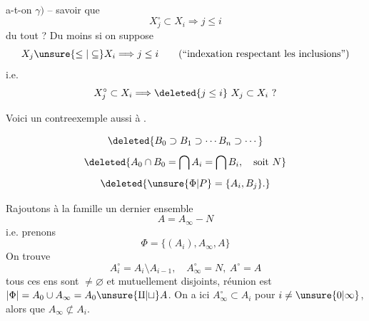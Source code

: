 
a-t-on $\gamma)$ -- savoir que
\[
X_j^\circ\subset X_i\Longrightarrow j\leq i
\]
du tout ? Du moins si  on suppose
\[
X_j\unsure{\leq|\subseteq}X_i\Longrightarrow j\leq i\qquad\text{(``indexation respectant les inclusions'')}
\]
i.e.
\[
X_j^\circ\subset X_i\Longrightarrow\deleted{j\leq i}\ X_j\subset X_i\ ?
\]

Voici un  contreexemple aussi à .

\[
\deleted{B_0\supset B_1\supset\cdots B_n\supset\cdots}
\]
\[
\deleted{A_0\cap B_0=\bigcap A_i=\bigcap B_i,\quad\text{soit }N}
\]
\[
\deleted{\unsure{\Phi|P}=\{A_i,B_j\}.}
\]

Rajoutons à la famille un dernier ensemble
\[
A=A_\infty-N
\]
i.e. prenons
\[
\Phi=\{(A_i),A_\infty,A\}
\]
On trouve
\[
A_i^\circ=A_i\setminus A_{i-1},\quad A_\infty^\circ=N,\ A^\circ=A
\]
tous ces ens sont $\ne\varnothing$ et mutuellement disjoints, réunion est $|\Phi|=A_0\cup A_\infty=A_0\unsure{\amalg|\sqcup}A$.
On a ici $A_\infty^\circ\subset A_i$ pour $i\ne\unsure{0|\infty}$, alors que $A_\infty\not\subset A_i$.
